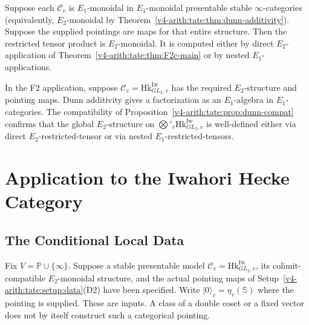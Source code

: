 \begin{corollary}[special case: \(E_{1}\otimes E_{1}=E_{2}\)]
\label{v4-arith:tate:cor:dunn-E1-E2}
\ClaimStatusProvedHere Suppose each \(\mathcal{C}_{v}\) is
\(E_{1}\)-monoidal in \(E_{1}\)-monoidal presentable stable
\(\infty\)-categories (equivalently,
\(E_{2}\)-monoidal by
Theorem~\ref{v4-arith:tate:thm:dunn-additivity}). Suppose the supplied
pointings are maps for that entire structure. Then the restricted
tensor product is \(E_{2}\)-monoidal. It is computed either by direct
\(E_{2}\)-application of Theorem~\ref{v4-arith:tate:thm:F2c-main} or by
nested \(E_{1}\)-applications.
\end{corollary}

\begin{remark}
\label{v4-arith:tate:rem:dunn-F2-role}
In the F2 application, suppose
\(\mathcal{C}_{v}=\mathrm{Hk}^{\mathrm{Iw}}_{GL_{2},v}\) has the
required \(E_2\)-structure and pointing maps. Dunn additivity gives a
factorization as an \(E_{1}\)-algebra in \(E_{1}\)-categories. The
compatibility of Proposition~\ref{v4-arith:tate:prop:dunn-compat} confirms
that the global \(E_{2}\)-structure on
\(\bigotimes'_{v}\mathrm{Hk}^{\mathrm{Iw}}_{GL_{2},v}\) is
well-defined either via direct \(E_{2}\)-restricted-tensor or via
nested \(E_{1}\)-restricted-tensors.
\end{remark}

\section{Application to the Iwahori Hecke Category}
\label{v4-arith:tate:iwahori-application}

\subsection{The Conditional Local Data}

\begin{setup}
\label{v4-arith:tate:setup:iwahori-Hecke-data}
Fix \(V=\mathbb P\cup\{\infty\}\). Suppose a stable presentable
model \(\mathcal C_v=\mathrm{Hk}^{\mathrm{Iw}}_{GL_2,v}\), its
colimit-compatible \(E_2\)-monoidal structure, and the actual
pointing maps of Setup~\ref{v4-arith:tate:setup:data}(D2) have
been specified. Write \(|0\rangle_v=\eta_v(\mathbb S)\) where the
pointing is supplied. These are inputs. A class of a double
coset or a fixed vector does not by itself construct such a
categorical pointing.
\end{setup}

